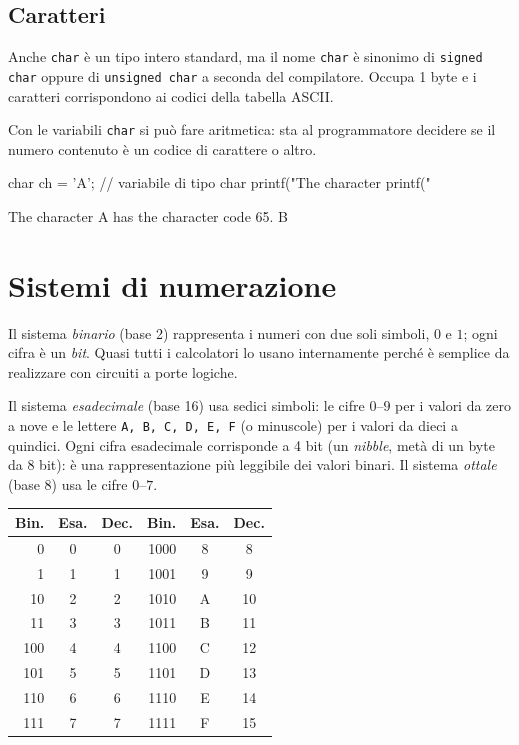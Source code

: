 \documentclass[11pt,a4paper]{article}
\begin{document}
\subsection{Caratteri}

Anche \lstinline|char| è un tipo intero standard, ma il nome \lstinline|char| è
sinonimo di \lstinline|signed char| oppure di \lstinline|unsigned char| a seconda
del compilatore. Occupa 1 byte e i caratteri corrispondono ai codici della
tabella ASCII.

Con le variabili \lstinline|char| si può fare aritmetica: sta al programmatore
decidere se il numero contenuto è un codice di carattere o altro.

\begin{codice}
char ch = 'A';       // variabile di tipo char
printf("The character %
printf("%
\end{codice}
\begin{risultato}
The character A has the character code 65.
B
\end{risultato}

\section{Sistemi di numerazione}

\begin{definizione}
Il sistema \emph{binario} (base 2) rappresenta i numeri con due soli simboli,
$0$ e $1$; ogni cifra è un \emph{bit}. Quasi tutti i calcolatori lo usano
internamente perché è semplice da realizzare con circuiti a porte logiche.
\end{definizione}

\begin{definizione}
Il sistema \emph{esadecimale} (base 16) usa sedici simboli: le cifre $0$--$9$ per
i valori da zero a nove e le lettere \texttt{A, B, C, D, E, F} (o minuscole) per
i valori da dieci a quindici. Ogni cifra esadecimale corrisponde a 4 bit (un
\emph{nibble}, metà di un byte da 8 bit): è una rappresentazione più
leggibile dei valori binari. Il sistema \emph{ottale} (base 8) usa le cifre
$0$--$7$.
\end{definizione}

\begin{center}
\begin{tabular}{rcc @{\qquad} rcc}
\toprule
\textbf{Bin.} & \textbf{Esa.} & \textbf{Dec.} &
\textbf{Bin.} & \textbf{Esa.} & \textbf{Dec.} \\
\midrule
0    & 0 & 0  & 1000 & 8 & 8 \\
1    & 1 & 1  & 1001 & 9 & 9 \\
10   & 2 & 2  & 1010 & A & 10 \\
11   & 3 & 3  & 1011 & B & 11 \\
100  & 4 & 4  & 1100 & C & 12 \\
101  & 5 & 5  & 1101 & D & 13 \\
110  & 6 & 6  & 1110 & E & 14 \\
111  & 7 & 7  & 1111 & F & 15 \\
\bottomrule
\end{tabular}
\end{center}
\end{document}
